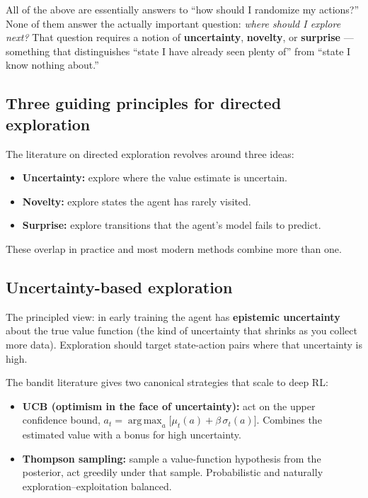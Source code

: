 \documentclass[11pt, oneside]{book}
\newcommand{\argmax}{\operatorname*{arg\,max}}
\begin{document}
\begin{intbox}[title={What's missing from these methods}]
All of the above are essentially answers to ``how should I randomize my actions?''
None of them answer the actually important question: \emph{where should I explore next?}
That question requires a notion of \textbf{uncertainty}, \textbf{novelty}, or
\textbf{surprise} --- something that distinguishes ``state I have already seen
plenty of'' from ``state I know nothing about.''
\end{intbox}

\subsection{Three guiding principles for directed exploration}

The literature on directed exploration revolves around three ideas:
\begin{itemize}
  \item \textbf{Uncertainty:} explore where the value estimate is uncertain.
  \item \textbf{Novelty:} explore states the agent has rarely visited.
  \item \textbf{Surprise:} explore transitions that the agent's model fails to predict.
\end{itemize}
These overlap in practice and most modern methods combine more than one.

\subsection{Uncertainty-based exploration}

The principled view: in early training the agent has \textbf{epistemic uncertainty}
about the true value function (the kind of uncertainty that shrinks as you collect more
data). Exploration should target state-action pairs where that uncertainty is high.

The bandit literature gives two canonical strategies that scale to deep RL:
\begin{itemize}
  \item \textbf{UCB (optimism in the face of uncertainty):} act on the upper confidence bound,
    $a_t = \argmax_a \bigl[\mu_t(a) + \beta\, \sigma_t(a)\bigr]$. Combines the
    estimated value with a bonus for high uncertainty.
  \item \textbf{Thompson sampling:} sample a value-function hypothesis from the posterior,
    act greedily under that sample. Probabilistic and naturally exploration--exploitation
    balanced.
\end{itemize}
\end{document}
